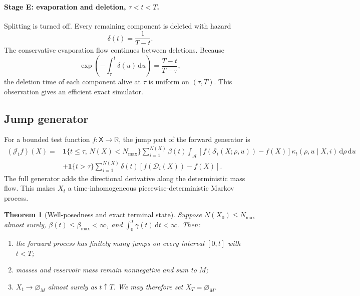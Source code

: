 \documentclass[10pt]{article}
\newtheorem{theorem}{Theorem}[section]
\theoremstyle{definition}
\theoremstyle{remark}
\newcommand{\R}{\mathbb{R}}
\newcommand{\dd}{\,\mathrm{d}}
\newcommand{\ind}{\mathbf{1}}
\newcommand{\emptyconfig}{\varnothing_M}
\newcommand{\state}{\mathsf{X}}
\newcommand{\splitmap}{\mathcal{S}}
\newcommand{\deathmap}{\mathcal{D}}
\begin{document}
\paragraph{Stage E: evaporation and deletion, $\tau<t<T$.}
Splitting is turned off.  Every remaining component is deleted with hazard
\begin{equation}
  \delta(t)=\frac{1}{T-t}.
  \label{eq:death-hazard}
\end{equation}
The conservative evaporation flow continues between deletions.  Because
\begin{equation}
  \exp\!\left(-\int_\tau^t\delta(u)\dd u\right)
  =\frac{T-t}{T-\tau},
  \label{eq:uniform-death-survival}
\end{equation}
the deletion time of each component alive at $\tau$ is uniform on $(\tau,T)$.  This observation gives an efficient exact simulator.

\subsection{Jump generator}

For a bounded test function $f:\state\to\R$, the jump part of the forward generator is
\begin{align}
  (\mathcal J_t f)(X)
  ={}&\ind\{t\leq\tau,\,N(X)<N_{\max}\}
  \sum_{i=1}^{N(X)}\beta(t)
  \int_{\mathcal A}
  \left[f\!\left(\splitmap_i(X;\rho,u)\right)-f(X)\right]
  \kappa_t(\rho,u\mid X,i)\dd\rho\dd u
  \nonumber\\
  &+\ind\{t>\tau\}
  \sum_{i=1}^{N(X)}\delta(t)
  \left[f\!\left(\deathmap_i(X)\right)-f(X)\right].
  \label{eq:forward-jump-generator}
\end{align}
The full generator adds the directional derivative along the deterministic mass flow.  This makes $X_t$ a time-inhomogeneous piecewise-deterministic Markov process.

\begin{theorem}[Well-posedness and exact terminal state]
\label{thm:forward-terminal}
Suppose $N(X_0)\leq N_{\max}$ almost surely,
$\beta(t)\leq\beta_{\max}<\infty$, and
$\int_0^T\gamma(t)\dd t<\infty$.  Then:
\begin{enumerate}
  \item the forward process has finitely many jumps on every interval $[0,t]$ with $t<T$;
  \item masses and reservoir mass remain nonnegative and sum to $M$;
  \item $X_t\to\emptyconfig$ almost surely as $t\uparrow T$.  We may therefore set $X_T=\emptyconfig$.
\end{enumerate}
\end{theorem}
\end{document}
